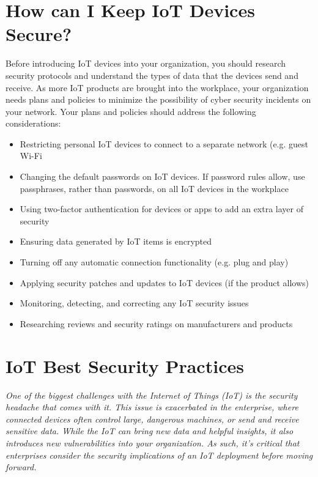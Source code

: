 \documentclass[12pt]{report}
\begin{document}
\section{How can I Keep IoT Devices Secure?}

Before introducing IoT devices into your organization, you should 
research security protocols and understand the types of data that the 
devices send and receive. As more IoT products are brought into the workplace, 
your organization needs plans and policies to minimize the possibility of 
cyber security incidents on your network. Your plans and policies should address 
the following considerations:

\begin{itemize}
    \item Restricting personal IoT devices to connect to a separate network (e.g. guest Wi-Fi
    \item Changing the default passwords on IoT devices. If password rules allow, use passphrases, rather than passwords, on all IoT devices in the workplace
    \item Using two-factor authentication for devices or apps to add an extra layer of security
    \item Ensuring data generated by IoT items is encrypted
    \item Turning off any automatic connection functionality (e.g. plug and play)
    \item Applying security patches and updates to IoT devices (if the product allows)
    \item Monitoring, detecting, and correcting any IoT security issues
    \item Researching reviews and security ratings on manufacturers and products
\end{itemize}

\section{IoT Best Security Practices}

\textit{One of the biggest challenges with the Internet of Things (IoT) is the security
    headache that comes with it. This issue is exacerbated in the enterprise, where 
    connected devices often control large, dangerous machines, or send and receive 
    sensitive data. While the IoT can bring new data and helpful insights, it also 
    introduces new vulnerabilities into your organization. As such, it’s critical 
    that enterprises consider the security implications of an IoT deployment before 
    moving forward.}
\end{document}
